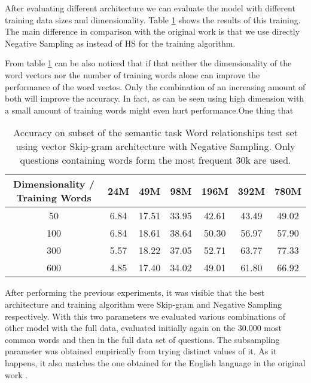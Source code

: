 After evaluating different architecture we can evaluate the model with
different  training data sizes and dimensionality. Table
\ref{tab:initial_w2v_training}  shows the results of this training.
The main difference in comparison with the original work is that we use directly Negative
Sampling as instead of \ac{HS} for the training algorithm. 


From table \ref{tab:initial_w2v_training} can be also noticed that  if that
neither the dimensionality of the word vectors nor the number of
training words alone can improve the performance of the word vectos. Only the
combination of an increasing amount of both will improve the accuracy. In
fact, as can be seen using high dimension with a small amount of training
words might even hurt performance.One thing that


\begin{table}[h]
\centering
\caption{Accuracy on subset of the semantic task Word relationships test set using
vector Skip-gram architecture with Negative Sampling. Only questions containing words form the most
 frequent 30k are used. } 
\label{tab:initial_w2v_training}

\small
\begin{tabular}{|c|cccccc|}
\hline
 Dimensionality / Training Words  &   24M  &    49M  &    98M  &   196M  &   392M  &   780M  \\
\hline
                              50  &  6.84  &  17.51  &  33.95  &  42.61  &  43.49  &  49.02  \\
                             100  &  6.84  &  18.61  &  38.64  &  50.30  &  56.97  &  57.90  \\
                             300  &  5.57  &  18.22  &  37.05  &  52.71  &  63.77  &  77.33  \\
                             600  &  4.85  &  17.40  &  34.02  &  49.01  &
                             61.80  &  66.92  \\
\hline
\end{tabular}
\end{table}


After performing the previous experiments, it was visible that the best
architecture and training algorithm were Skip-gram and Negative Sampling
respectively. With this two parameters we evaluated various combinations of
other model with the full data, evaluated initially again on the 30.000 most
common words  and then in the full data set of questions. The subsampling
parameter was obtained empirically from trying distinct values of it. As it
happens, it also matches the one obtained for the English language in the
original work \cite{DBLP:journals/corr/abs-1301-3781}.

